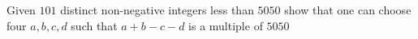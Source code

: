Given $101$ distinct non-negative integers less than $5050$ show that one can choose four $a, b, c, d$ such that $a + b - c - d$ is a multiple of $5050$